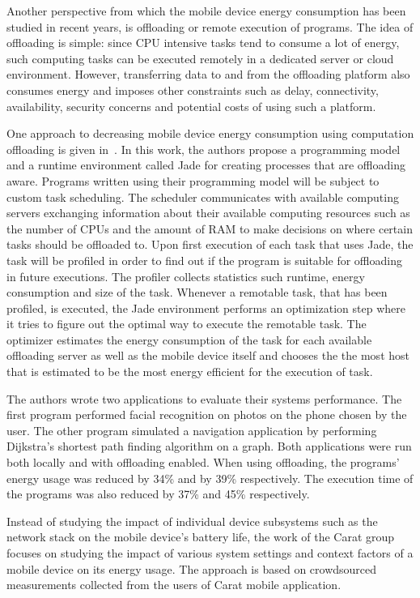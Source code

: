 Another perspective from which the mobile device energy consumption has been studied in recent years, is offloading or remote execution of programs. The idea of offloading is simple: since CPU intensive tasks tend to consume a lot of energy, such computing tasks can be executed remotely in a dedicated server or cloud environment. However, transferring data to and from the offloading platform also consumes energy and imposes other constraints such as delay, connectivity, availability, security concerns and potential costs of using such a platform.

One approach to decreasing mobile device energy consumption using computation offloading is given in~\cite{7176219}. In this work, the authors propose a programming model and a runtime environment called Jade for creating processes that are offloading aware. Programs written using their programming model will be subject to custom task scheduling. The scheduler communicates with available computing servers exchanging information about their available computing resources such as the number of CPUs and the amount of RAM to make decisions on where certain tasks should be offloaded to. Upon first execution of each task that uses Jade, the task will be profiled in order to find out if the program is suitable for offloading in future executions. The profiler collects statistics such runtime, energy consumption and size of the task. Whenever a remotable task, that has been profiled, is executed, the Jade environment performs an optimization step where it tries to figure out the optimal way to execute the remotable task. The optimizer estimates the energy consumption of the task for each available offloading server as well as the mobile device itself and chooses the the most host that is estimated to be the most energy efficient for the execution of task.

The authors wrote two applications to evaluate their systems performance. The first program performed facial recognition on photos on the phone chosen by the user. The other program simulated a navigation application by performing Dijkstra's shortest path finding algorithm on a graph. Both applications were run both locally and with offloading enabled. When using offloading, the programs' energy usage was reduced by 34\% and by 39\% respectively. The execution time of the programs was also reduced by 37\% and 45\% respectively.                 

Instead of studying the impact of individual device subsystems such as the network stack on the mobile device's battery life, the work of the Carat group focuses on studying the impact of various system settings and context factors of a mobile device on its energy usage. The approach is based on crowdsourced measurements collected from the users of Carat mobile application. 

